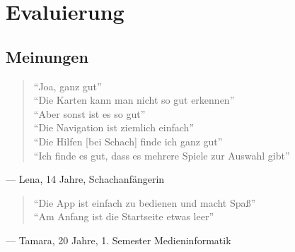 \chapter{Evaluierung}

\section{Meinungen}

\begin{quote}
``Joa, ganz gut'' \\
``Die Karten kann man nicht so gut erkennen'' \\
``Aber sonst ist es so gut'' \\
``Die Navigation ist ziemlich einfach'' \\
``Die Hilfen [bei Schach] finde ich ganz gut'' \\
``Ich finde es gut, dass es mehrere Spiele zur Auswahl gibt''
\end{quote}
--- Lena, 14 Jahre, Schachanfängerin
\begin{quote}
``Die App ist einfach zu bedienen und macht Spaß'' \\
``Am Anfang ist die Startseite etwas leer'' 
\end{quote}
--- Tamara, 20 Jahre, 1. Semester Medieninformatik

